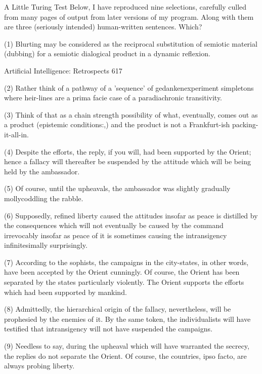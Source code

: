 {                                 A Little Turing Test
Below, I have reproduced nine selections, carefully culled from many pages of output
from later versions of my program. Along with them are three (seriously intended)
human-written sentences. Which?

   (1) Blurting may be considered as the reciprocal substitution of semiotic material
   (dubbing) for a semiotic dialogical product in a dynamic reflexion.




Artificial Intelligence: Retrospects                                                     617

   (2) Rather think of a pathway of a 'sequence' of gedankenexperiment simpletons
      where heir-lines are a prima facie case of a paradiachronic transitivity.

   (3) Think of that as a chain strength possibility of what, eventually, comes out as a
      product (epistemic conditions:,) and the product is not a Frankfurt-ish packing-
      it-all-in.

   (4) Despite the efforts, the reply, if you will, had been supported by the Orient;
      hence a fallacy will thereafter be suspended by the attitude which will be being
      held by the ambassador.

   (5) Of course, until the upheavals, the ambassador was slightly gradually
      mollycoddling the rabble.

   (6) Supposedly, refined liberty caused the attitudes insofar as peace is distilled by
      the consequences which will not eventually be caused by the command
      irrevocably insofar as peace of it is sometimes causing the intransigency
      infinitesimally surprisingly.

   (7) According to the sophists, the campaigns in the city-states, in other words, have
      been accepted by the Orient cunningly. Of course, the Orient has been separated
      by the states particularly violently.
      The Orient supports the efforts which had been supported by mankind.

   (8) Admittedly, the hierarchical origin of the fallacy, nevertheless, will be
      prophesied by the enemies of it. By the same token, the individualists will have
      testified that intransigency will not have suspended the campaigns.

   (9) Needless to say, during the upheaval which will have warranted the secrecy, the
      replies do not separate the Orient. Of course, the countries, ipso facto, are
      always probing liberty.

}
